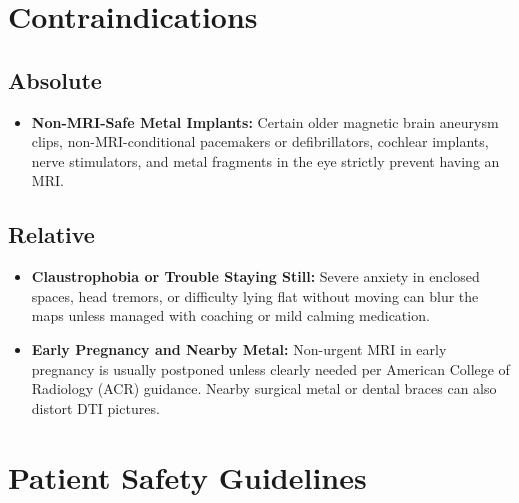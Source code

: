 \section{Contraindications}

\subsection{Absolute}

\begin{itemize}
    \item \textbf{Non-MRI-Safe Metal Implants:} Certain older magnetic brain aneurysm clips, non-MRI-conditional pacemakers or defibrillators, cochlear implants, nerve stimulators, and metal fragments in the eye strictly prevent having an MRI.
\end{itemize}

\subsection{Relative}

\begin{itemize}
    \item \textbf{Claustrophobia or Trouble Staying Still:} Severe anxiety in enclosed spaces, head tremors, or difficulty lying flat without moving can blur the maps unless managed with coaching or mild calming medication.
    \item \textbf{Early Pregnancy and Nearby Metal:} Non-urgent MRI in early pregnancy is usually postponed unless clearly needed per American College of Radiology (ACR) guidance. Nearby surgical metal or dental braces can also distort DTI pictures.
\end{itemize}

\section{Patient Safety Guidelines}

